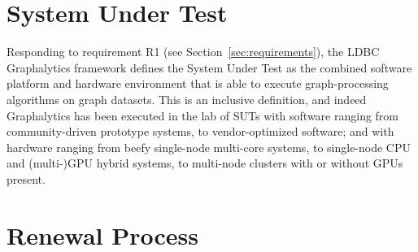 










\section{System Under Test} \label{sec:sut}

Responding to requirement R1 (see Section~\ref{sec:requirements}), the LDBC Graphalytics framework defines the System Under Test as the combined software platform and hardware environment that is able to execute graph-processing algorithms on graph datasets. This is an inclusive definition, and indeed Graphalytics has been executed in the lab of SUTs with software ranging from community-driven prototype systems, to vendor-optimized software; and with hardware ranging from beefy single-node multi-core systems, to single-node CPU and (multi-)GPU hybrid systems, to multi-node clusters with or without GPUs present. 


\section{Renewal Process} \label{sec:renewal}

